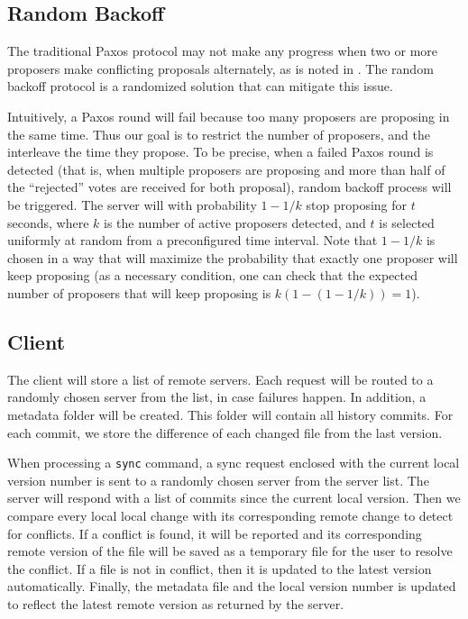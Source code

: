 \documentclass[11pt]{article}
\begin{document}
\subsection{Random Backoff}
The traditional Paxos protocol may not make any progress when two or more proposers make conflicting proposals alternately,
as is noted in \cite{paxos}.
The random backoff protocol is a randomized solution that can mitigate this issue.

Intuitively, a Paxos round will fail because too many proposers are proposing in the same time.
Thus our goal is to restrict the number of proposers, and the interleave the time they propose.
To be precise, when a failed Paxos round is detected (that is, when multiple proposers are proposing and more than half of the ``rejected'' votes are received for both proposal),
random backoff process will be triggered.
The server will with probability $1-1/k$ stop proposing for $t$ seconds, where $k$ is the number of active proposers detected, and $t$ is selected uniformly at random from a preconfigured time interval.
Note that $1-1/k$ is chosen in a way that will maximize the probability that exactly one proposer will keep proposing
(as a necessary condition, one can check that the expected number of proposers that will keep proposing is $k\left(1-\left(1-1/k\right)\right)=1$).

\subsection{Client}

The client will store a list of remote servers.
Each request will be routed to a randomly chosen server from the list, in case failures happen.
In addition, a metadata folder will be created.
This folder will contain all history commits.
For each commit, we store the difference of each changed file from the last version.

When processing a \texttt{sync} command, a sync request enclosed with the current local version number is sent to a randomly chosen server from the server list.
The server will respond with a list of commits since the current local version.
Then we compare every local local change with its corresponding remote change to detect for conflicts.
If a conflict is found, it will be reported and its corresponding remote version of the file will be saved as a temporary file for the user to resolve the conflict.
If a file is not in conflict, then it is updated to the latest version automatically.
Finally, the metadata file and the local version number is updated to reflect the latest remote version as returned by the server.
\end{document}
